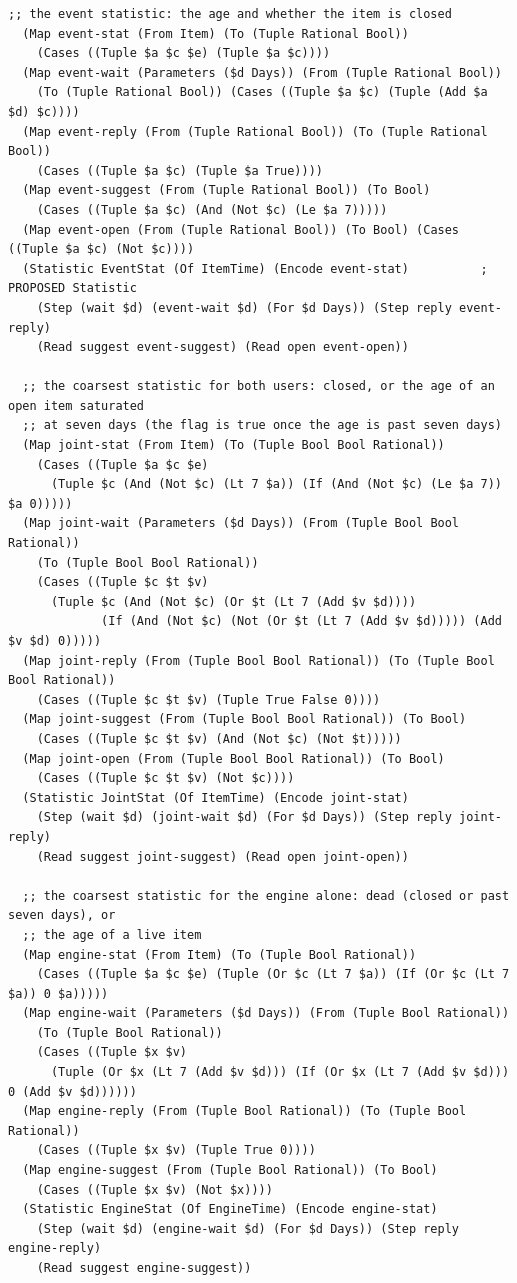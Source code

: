 \documentclass[11pt]{article}
\theoremstyle{definition}
\theoremstyle{plain}
\begin{document}
\begin{lstlisting}[style=mettafull]
  ;; the event statistic: the age and whether the item is closed
  (Map event-stat (From Item) (To (Tuple Rational Bool))
    (Cases ((Tuple $a $c $e) (Tuple $a $c))))
  (Map event-wait (Parameters ($d Days)) (From (Tuple Rational Bool))
    (To (Tuple Rational Bool)) (Cases ((Tuple $a $c) (Tuple (Add $a $d) $c))))
  (Map event-reply (From (Tuple Rational Bool)) (To (Tuple Rational Bool))
    (Cases ((Tuple $a $c) (Tuple $a True))))
  (Map event-suggest (From (Tuple Rational Bool)) (To Bool)
    (Cases ((Tuple $a $c) (And (Not $c) (Le $a 7)))))
  (Map event-open (From (Tuple Rational Bool)) (To Bool) (Cases ((Tuple $a $c) (Not $c))))
  (Statistic EventStat (Of ItemTime) (Encode event-stat)          ; PROPOSED Statistic
    (Step (wait $d) (event-wait $d) (For $d Days)) (Step reply event-reply)
    (Read suggest event-suggest) (Read open event-open))

  ;; the coarsest statistic for both users: closed, or the age of an open item saturated
  ;; at seven days (the flag is true once the age is past seven days)
  (Map joint-stat (From Item) (To (Tuple Bool Bool Rational))
    (Cases ((Tuple $a $c $e)
      (Tuple $c (And (Not $c) (Lt 7 $a)) (If (And (Not $c) (Le $a 7)) $a 0)))))
  (Map joint-wait (Parameters ($d Days)) (From (Tuple Bool Bool Rational))
    (To (Tuple Bool Bool Rational))
    (Cases ((Tuple $c $t $v)
      (Tuple $c (And (Not $c) (Or $t (Lt 7 (Add $v $d))))
             (If (And (Not $c) (Not (Or $t (Lt 7 (Add $v $d))))) (Add $v $d) 0)))))
  (Map joint-reply (From (Tuple Bool Bool Rational)) (To (Tuple Bool Bool Rational))
    (Cases ((Tuple $c $t $v) (Tuple True False 0))))
  (Map joint-suggest (From (Tuple Bool Bool Rational)) (To Bool)
    (Cases ((Tuple $c $t $v) (And (Not $c) (Not $t)))))
  (Map joint-open (From (Tuple Bool Bool Rational)) (To Bool)
    (Cases ((Tuple $c $t $v) (Not $c))))
  (Statistic JointStat (Of ItemTime) (Encode joint-stat)
    (Step (wait $d) (joint-wait $d) (For $d Days)) (Step reply joint-reply)
    (Read suggest joint-suggest) (Read open joint-open))

  ;; the coarsest statistic for the engine alone: dead (closed or past seven days), or
  ;; the age of a live item
  (Map engine-stat (From Item) (To (Tuple Bool Rational))
    (Cases ((Tuple $a $c $e) (Tuple (Or $c (Lt 7 $a)) (If (Or $c (Lt 7 $a)) 0 $a)))))
  (Map engine-wait (Parameters ($d Days)) (From (Tuple Bool Rational))
    (To (Tuple Bool Rational))
    (Cases ((Tuple $x $v)
      (Tuple (Or $x (Lt 7 (Add $v $d))) (If (Or $x (Lt 7 (Add $v $d))) 0 (Add $v $d))))))
  (Map engine-reply (From (Tuple Bool Rational)) (To (Tuple Bool Rational))
    (Cases ((Tuple $x $v) (Tuple True 0))))
  (Map engine-suggest (From (Tuple Bool Rational)) (To Bool)
    (Cases ((Tuple $x $v) (Not $x))))
  (Statistic EngineStat (Of EngineTime) (Encode engine-stat)
    (Step (wait $d) (engine-wait $d) (For $d Days)) (Step reply engine-reply)
    (Read suggest engine-suggest))


\end{lstlisting}
\end{document}
